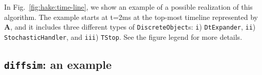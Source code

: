 In Fig.~\ref{fig:hake:time-line}, we show an example of a possible
realization of this algorithm. The example starts at t=2ms at the
top-most timeline represented by \textbf{A}, and it includes three
different types of \texttt{DiscreteObject}s: \texttt{i})
\texttt{DtExpander}, \texttt{ii}) \texttt{StochasticHandler}, and
\texttt{iii}) \texttt{TStop}. See the figure legend for more details.
\subsection{\texttt{diffsim}: an example}
 

